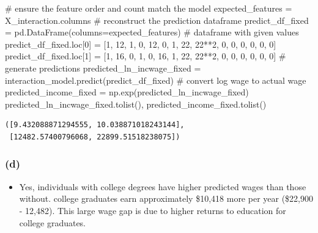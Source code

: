\documentclass[
  letterpaper,
  DIV=11,
  numbers=noendperiod]{scrartcl}
\newenvironment{Shaded}{\begin{snugshade}}{\end{snugshade}}
\newcommand{\CommentTok}[1]{\textcolor[rgb]{0.37,0.37,0.37}{#1}}
\newcommand{\DecValTok}[1]{\textcolor[rgb]{0.68,0.00,0.00}{#1}}
\newcommand{\NormalTok}[1]{\textcolor[rgb]{0.00,0.23,0.31}{#1}}
\newcommand{\OperatorTok}[1]{\textcolor[rgb]{0.37,0.37,0.37}{#1}}
\providecommand{\tightlist}{%
  \setlength{\itemsep}{0pt}\setlength{\parskip}{0pt}}\usepackage{longtable,booktabs,array}
\begin{document}
\begin{Shaded}
\begin{Highlighting}[]
\CommentTok{\# ensure the feature order and count match the model}
\NormalTok{expected\_features }\OperatorTok{=}\NormalTok{ X\_interaction.columns }
\CommentTok{\# reconstruct the prediction dataframe }
\NormalTok{predict\_df\_fixed }\OperatorTok{=}\NormalTok{ pd.DataFrame(columns}\OperatorTok{=}\NormalTok{expected\_features)}
\CommentTok{\# dataframe with given values}
\NormalTok{predict\_df\_fixed.loc[}\DecValTok{0}\NormalTok{] }\OperatorTok{=}\NormalTok{ [}\DecValTok{1}\NormalTok{, }\DecValTok{12}\NormalTok{, }\DecValTok{1}\NormalTok{, }\DecValTok{0}\NormalTok{, }\DecValTok{12}\NormalTok{, }\DecValTok{0}\NormalTok{, }\DecValTok{1}\NormalTok{, }\DecValTok{22}\NormalTok{, }\DecValTok{22}\OperatorTok{**}\DecValTok{2}\NormalTok{, }\DecValTok{0}\NormalTok{, }\DecValTok{0}\NormalTok{, }\DecValTok{0}\NormalTok{, }\DecValTok{0}\NormalTok{, }\DecValTok{0}\NormalTok{, }\DecValTok{0}\NormalTok{]  }
\NormalTok{predict\_df\_fixed.loc[}\DecValTok{1}\NormalTok{] }\OperatorTok{=}\NormalTok{ [}\DecValTok{1}\NormalTok{, }\DecValTok{16}\NormalTok{, }\DecValTok{0}\NormalTok{, }\DecValTok{1}\NormalTok{, }\DecValTok{0}\NormalTok{, }\DecValTok{16}\NormalTok{, }\DecValTok{1}\NormalTok{, }\DecValTok{22}\NormalTok{, }\DecValTok{22}\OperatorTok{**}\DecValTok{2}\NormalTok{, }\DecValTok{0}\NormalTok{, }\DecValTok{0}\NormalTok{, }\DecValTok{0}\NormalTok{, }\DecValTok{0}\NormalTok{, }\DecValTok{0}\NormalTok{, }\DecValTok{0}\NormalTok{]  }
\CommentTok{\# generate predictions }
\NormalTok{predicted\_ln\_incwage\_fixed }\OperatorTok{=}\NormalTok{ interaction\_model.predict(predict\_df\_fixed)}
\CommentTok{\# convert log wage to actual wage}
\NormalTok{predicted\_income\_fixed }\OperatorTok{=}\NormalTok{ np.exp(predicted\_ln\_incwage\_fixed)}
\NormalTok{predicted\_ln\_incwage\_fixed.tolist(), predicted\_income\_fixed.tolist()}
\end{Highlighting}
\end{Shaded}

\begin{verbatim}
([9.432088871294555, 10.038871018243144],
 [12482.57400796068, 22899.51518238075])
\end{verbatim}

\subsubsection{(d)}\label{d-2}

\begin{itemize}
\tightlist
\item
  Yes, individuals with college degrees have higher predicted wages than
  those without. college graduates earn approximately \$10,418 more per
  year (\$22,900 - 12,482). This large wage gap is due to higher returns
  to education for college graduates.
\end{itemize}
\end{document}
